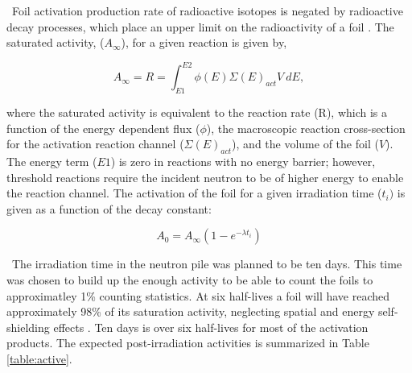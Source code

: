 \documentclass[journal]{IEEEtran}
\begin{document}
	\ Foil activation production rate of radioactive isotopes is negated by radioactive decay processes, which place an upper limit on the radioactivity of a foil \cite{Knoll}. The saturated activity, ($A_{\infty}$), for a given reaction is given by, 

	\begin{equation} \label{eq:InfReactionRate}
	A_{\infty} = R = \int_{E1}^{E2} \phi(E) \Sigma(E)_{act} V
	\:dE ,
	\end{equation}
	
	\noindent where the saturated activity is equivalent to the reaction rate (R), which is a function of the energy dependent flux ($\phi$), the macroscopic reaction cross-section for the activation reaction channel ($\Sigma(E)_{act}$), and the volume of the foil ($V$). The energy term ($E1$) is zero in reactions with no energy barrier; however, threshold reactions require the incident neutron to be of higher energy to enable the reaction channel. 
The activation of the foil for a given	irradiation time ($t_{i})$ is given as a function of the decay constant: 
	
	\begin{equation} \label{eq:ReactionRate}
	A_{0} = A_{\infty}(1-e^{-\lambda t_{i}}) 
	\end{equation}
	
	\ The irradiation time in the neutron pile was planned to be ten days. This time was chosen to build up the enough activity to be able to count the foils to approximatley 1\% counting statistics. At six half-lives a foil will have reached approximately 98\% of its saturation activity, neglecting spatial and energy self-shielding effects \cite{Knoll}. Ten days is over six half-lives for most of the activation products. The expected post-irradiation activities is summarized in Table \ref{table:active}.  
	
\end{document}
